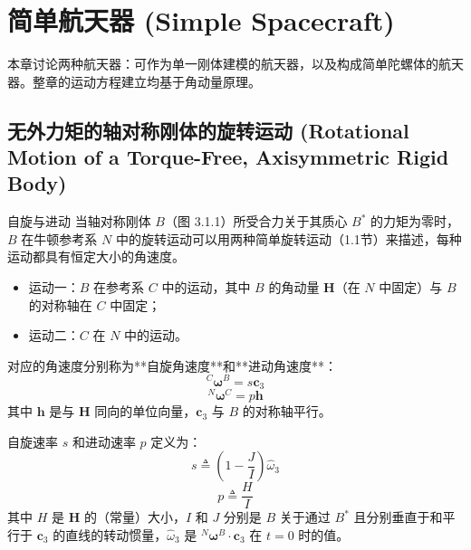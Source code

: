 \chapter{简单航天器 (Simple Spacecraft)}

本章讨论两种航天器：可作为单一刚体建模的航天器，以及构成简单陀螺体的航天器。整章的运动方程建立均基于角动量原理。

\section{无外力矩的轴对称刚体的旋转运动 (Rotational Motion of a Torque-Free, Axisymmetric Rigid Body)}

\begin{mydefinition}{自旋与进动}
当轴对称刚体 \(B\)（图 3.1.1）所受合力关于其质心 \(B^*\) 的力矩为零时，\(B\) 在牛顿参考系 \(N\) 中的旋转运动可以用两种简单旋转运动（1.1节）来描述，每种运动都具有恒定大小的角速度。
\begin{itemize}
    \item 运动一：\(B\) 在参考系 \(C\) 中的运动，其中 \(B\) 的角动量 \(\mathbf{H}\)（在 \(N\) 中固定）与 \(B\) 的对称轴在 \(C\) 中固定；
    \item 运动二：\(C\) 在 \(N\) 中的运动。
\end{itemize}
对应的角速度分别称为**自旋角速度**和**进动角速度**：
\begin{equation}
^C\boldsymbol{\omega}^B = s\mathbf{c}_3 \tag{1}
\end{equation}
\begin{equation}
^N\boldsymbol{\omega}^C = p\mathbf{h} \tag{2}
\end{equation}
其中 \(\mathbf{h}\) 是与 \(\mathbf{H}\) 同向的单位向量，\(\mathbf{c}_3\) 与 \(B\) 的对称轴平行。
\end{mydefinition}

自旋速率 \(s\) 和进动速率 \(p\) 定义为：
\begin{equation}
s \triangleq \left(1 - \frac{J}{I}\right)\hat{\omega}_3 \tag{3}
\end{equation}
\begin{equation}
p \triangleq \frac{H}{I} \tag{4}
\end{equation}
其中 \(H\) 是 \(\mathbf{H}\) 的（常量）大小，\(I\) 和 \(J\) 分别是 \(B\) 关于通过 \(B^*\) 且分别垂直于和平行于 \(\mathbf{c}_3\) 的直线的转动惯量，\(\hat{\omega}_3\) 是 \(^N\boldsymbol{\omega}^B \cdot \mathbf{c}_3\) 在 \(t=0\) 时的值。

